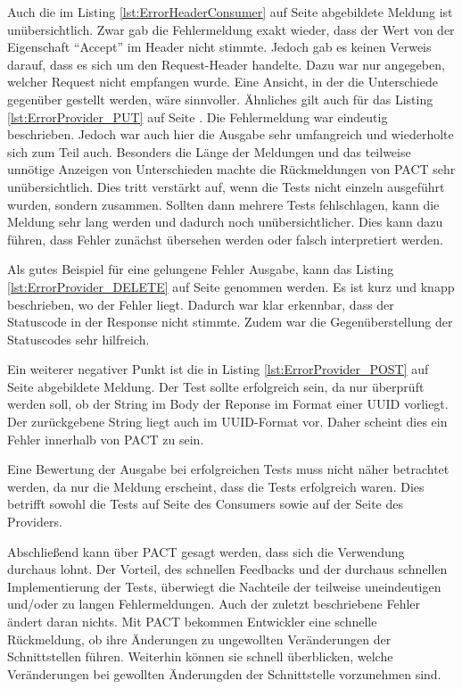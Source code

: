 \documentclass{llncs}
\begin{document}
Auch die im Listing \ref{lst:ErrorHeaderConsumer} auf Seite \pageref{lst:ErrorHeaderConsumer} abgebildete Meldung ist unübersichtlich. Zwar gab die Fehlermeldung exakt wieder, dass der Wert von der Eigenschaft \enquote{Accept} im Header nicht stimmte. Jedoch gab es keinen Verweis darauf, dass es sich um den Request-Header handelte. Dazu war nur angegeben, welcher Request nicht empfangen wurde. Eine Ansicht, in der die Unterschiede gegenüber gestellt werden, wäre sinnvoller.
Ähnliches gilt auch für das Listing \ref{lst:ErrorProvider_PUT} auf Seite \pageref{lst:ErrorProvider_PUT}. Die Fehlermeldung war eindeutig beschrieben. Jedoch war auch hier die Ausgabe sehr umfangreich und wiederholte sich zum Teil auch. Besonders die Länge der Meldungen und das teilweise unnötige Anzeigen von Unterschieden machte die Rückmeldungen von PACT sehr unübersichtlich. Dies tritt verstärkt auf, wenn die Tests nicht einzeln ausgeführt wurden, sondern zusammen. Sollten dann mehrere Tests fehlschlagen, kann die Meldung sehr lang werden und dadurch noch unübersichtlicher. Dies kann dazu führen, dass Fehler zunächst übersehen werden oder falsch interpretiert werden.

Als gutes Beispiel für eine gelungene Fehler Ausgabe, kann das Listing \ref{lst:ErrorProvider_DELETE} auf Seite \pageref{lst:ErrorProvider_DELETE} genommen werden. Es ist kurz und knapp beschrieben, wo der Fehler liegt. Dadurch war klar erkennbar, dass der Statuscode in der Response nicht stimmte. Zudem war die Gegenüberstellung der Statuscodes sehr hilfreich.

Ein weiterer negativer Punkt ist die in Listing \ref{lst:ErrorProvider_POST} auf Seite \pageref{lst:ErrorProvider_POST} abgebildete Meldung. Der Test sollte erfolgreich sein, da nur überprüft werden soll, ob der String im Body der Reponse im Format einer UUID vorliegt. Der zurückgebene String liegt auch im UUID-Format vor. Daher scheint dies ein Fehler innerhalb von PACT zu sein. 

Eine Bewertung der Ausgabe bei erfolgreichen Tests muss nicht näher betrachtet werden, da nur die Meldung erscheint, dass die Tests erfolgreich waren. Dies betrifft sowohl die Tests auf Seite des Consumers sowie auf der Seite des Providers.

Abschließend kann über PACT gesagt werden, dass sich die Verwendung durchaus lohnt. Der Vorteil, des schnellen Feedbacks und der durchaus schnellen Implementierung der Tests, überwiegt die Nachteile der teilweise uneindeutigen und/oder zu langen Fehlermeldungen. Auch der zuletzt beschriebene Fehler ändert daran nichts. Mit PACT bekommen Entwickler eine schnelle Rückmeldung, ob ihre Änderungen zu ungewollten Veränderungen der Schnittstellen führen. Weiterhin können sie schnell überblicken, welche Veränderungen bei gewollten Änderungden der Schnittstelle vorzunehmen sind.
\end{document}
